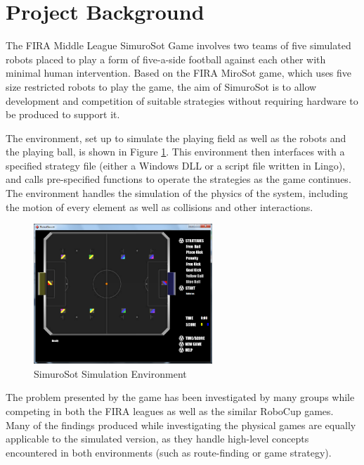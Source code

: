 \documentclass[a4paper,10pt]{article}
\begin{document}
\acresetall
\tableofcontents

\cleardoublepage
\acresetall


\section{Project Background}
The \ac{FIRA} Middle League SimuroSot Game involves two teams of five simulated robots placed to play a form of five-a-side football against each other with minimal human intervention.  Based on the \ac{FIRA} MiroSot game, which uses five size restricted robots to play the game, the aim of SimuroSot is to allow development and competition of suitable strategies without requiring hardware to be produced to support it. \cite{simurosotSim}

The environment, set up to simulate the playing field as well as the robots and the playing ball, is shown in Figure \ref{fig:simulatorEnvironment}.  This environment then interfaces with a specified strategy file (either a Windows \ac{DLL} or a script file written in Lingo), and calls pre-specified functions to operate the strategies as the game continues.  The environment handles the simulation of the physics of the system, including the motion of every element as well as collisions and other interactions.

\begin{figure}
 \centering
 \includegraphics[width=0.6\textwidth]{Images/simulator-screenshot.png}
 \caption{SimuroSot Simulation Environment}
 \label{fig:simulatorEnvironment}
\end{figure}



The problem presented by the game has been investigated by many groups while competing in both the \ac{FIRA} leagues as well as the similar RoboCup games.  Many of the findings produced while investigating the physical games are equally applicable to the simulated version, as they handle high-level concepts encountered in both environments (such as route-finding or game strategy).
\end{document}
